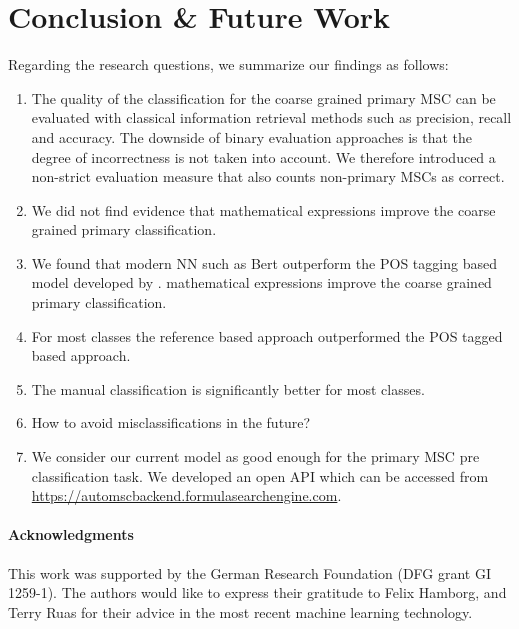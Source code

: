 \section{Conclusion \& Future Work}\label{sec.concl}
Regarding the research questions, we summarize our findings as follows:
\begin{enumerate}
  \item The quality of the classification for the coarse grained primary MSC can be evaluated with classical information retrieval methods such as precision, recall and accuracy. The downside of binary evaluation approaches is that the degree of incorrectness is not taken into account. We therefore introduced a non-strict evaluation measure that also counts non-primary MSCs as correct.
  \item We did not find evidence that mathematical expressions improve the coarse grained primary classification.
  \item We found that modern NN such as Bert outperform the POS tagging based model developed by \cite{SchonebergS14}. mathematical expressions improve the coarse grained primary classification.
  \item For most classes the reference based approach outperformed the POS tagged based approach.
  \item The manual classification is significantly better for most classes. 
  \item How to avoid misclassifications in the future?
  \item We consider our current model as good enough for the primary MSC pre classification task. We developed an open API which can be accessed from \url{https://automscbackend.formulasearchengine.com}.
\end{enumerate}

\paragraph{Acknowledgments} This work was supported by the German Research Foundation (DFG grant GI 1259-1).
The authors would like to express their gratitude to Felix Hamborg, and Terry Ruas for their advice in the most recent machine learning technology.
\printbibliography[keyword=primary]